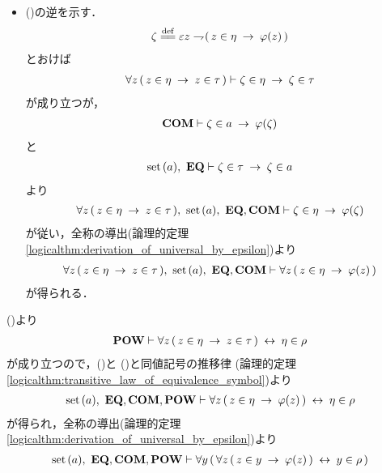 \begin{sketch}
\begin{description}
\begin{itemize}
					\item ()の逆を示す．
						\begin{align}
							\zeta \defeq \varepsilon z \negation
							(\, z \in \eta \rarrow \varphi(z)\, )
						\end{align}
						とおけば
						\begin{align}
							\forall z\, (\, z \in \eta \hspace{0.25em}\rightarrow\hspace{0.25em} z \in \tau\, )
							\vdash \zeta \in \eta \hspace{0.25em}\rightarrow\hspace{0.25em} \zeta \in \tau
						\end{align}
						が成り立つが，
						\begin{align}
							\mbox{\bf COM} \vdash \zeta \in a \hspace{0.25em}\rightarrow\hspace{0.25em} \varphi(\zeta)
						\end{align}
						と
						\begin{align}
							\operatorname*{set}\hspace{0.15em}(a),\ \mbox{{\bf EQ}} \vdash \zeta \in \tau \hspace{0.25em}\rightarrow\hspace{0.25em} \zeta \in a
						\end{align}
						より
						\begin{align}
							\forall z\, (\, z \in \eta \rarrow z \in \tau\, ),\ 
							\set{a},\ \EQAX,\COMAX
							\vdash \zeta \in \eta \rarrow \varphi(\zeta)
						\end{align}
						が従い，全称の導出(論理的定理\ref{logicalthm:derivation_of_universal_by_epsilon})より
						\begin{align}
							\forall z\, (\, z \in \eta \rarrow z \in \tau\, ),\ 
							\set{a},\ \EQAX,\COMAX \vdash 
							\forall z\, (\, z \in \eta \rarrow \varphi(z)\, )
						\end{align}
						が得られる．
				\end{itemize}
				()より
				\begin{align}
					\mbox{{\bf POW}} \vdash \forall z\, (\, z \in \eta \hspace{0.25em}\rightarrow\hspace{0.25em} z \in \tau\, )
					\hspace{0.25em}\leftrightarrow\hspace{0.25em} \eta \in \rho
					\label{fom:power_of_a_set_is_a_set_5}
				\end{align}
				が成り立つので，()と
				()と同値記号の推移律
				(論理的定理\ref{logicalthm:transitive_law_of_equivalence_symbol})より
				\begin{align}
					\operatorname*{set}\hspace{0.15em}(a),\ \mbox{{\bf EQ}},\mbox{\bf COM},\mbox{{\bf POW}} \vdash 
					\forall z\, (\, z \in \eta \hspace{0.25em}\rightarrow\hspace{0.25em} \varphi(z)\, ) \hspace{0.25em}\leftrightarrow\hspace{0.25em} \eta \in \rho
				\end{align}
				が得られ，全称の導出(論理的定理\ref{logicalthm:derivation_of_universal_by_epsilon})より
				\begin{align}
					\set{a},\ \EQAX,\COMAX,\POWAX \vdash 
					\forall y\, (\, \forall z\, (\, z \in y \rarrow \varphi(z)\, ) \lrarrow y \in \rho\, )

\end{align}
\end{description}
\end{sketch}
